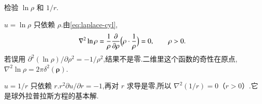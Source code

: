 \begin{example}
检验 $\ln\rho$ 和 $1/r$.
\end{example}
\begin{solution}
$u=\ln\rho$ 只依赖 $\rho$.由\eqref{eq:laplace-cyl},
\begin{equation}
  \nabla^2\ln\rho
  =\frac{1}{\rho}\frac{\partial}{\partial\rho}
    \Bigl(\rho\cdot\frac{1}{\rho}\Bigr)
  =0,
  \qquad\rho>0.
\end{equation}
若误用 $\partial^2(\ln\rho)/\partial\rho^2=-1/\rho^2$,结果不是零.二维里这个函数的奇性在原点,$\nabla^2\ln\rho=2\pi\delta^2(\boldsymbol{\rho})$.

$u=1/r$ 只依赖 $r$.$r^2\partial u/\partial r=-1$,再对 $r$ 求导是零,所以 $\nabla^2(1/r)=0$（$r>0$）.它是球外拉普拉斯方程的基本解.
\end{solution}
